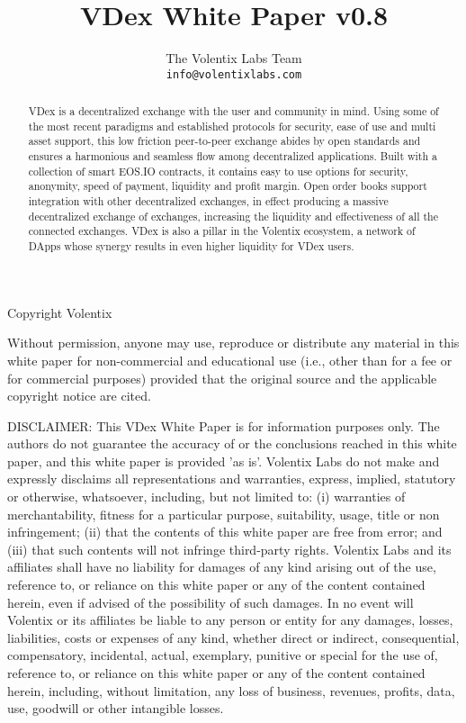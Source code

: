\documentclass[]{article}
\title{VDex White Paper v0.8}
\author{
		The Volentix Labs Team\\
	\texttt{info@volentixlabs.com}
}
\begin{document}
\tableofcontents
\maketitle
\begin{description}
\item Copyright  Volentix
\end{description}

{\tiny Without permission, anyone may use, reproduce or distribute any material in this white paper for non-commercial and educational use (i.e., other than for a fee or for commercial purposes) provided that the original source and the applicable copyright notice are cited.

DISCLAIMER: This VDex White Paper  is for information purposes only. The authors do not guarantee the accuracy of or the conclusions reached in this white paper, and this white paper is provided 'as is'. 
Volentix Labs do not make and expressly disclaims all representations and warranties, express, implied, statutory or otherwise, whatsoever, including, but not limited to: 
(i) warranties of merchantability, fitness for a particular purpose, suitability, usage, title or non infringement; (ii) that the contents of this white paper are free from error; and (iii) that such contents will not infringe third-party rights. Volentix Labs and its affiliates shall have no liability for damages of any kind arising out of the use, reference to, or reliance on this white paper or any of the content contained herein, even if advised of the possibility of such damages. In no event will Volentix or its affiliates be liable to any person or entity for any damages, losses, liabilities, costs or expenses of any kind, whether direct or indirect, consequential, compensatory, incidental, actual, exemplary, punitive or special for the use of, reference to, or reliance on this white paper or any of the content contained herein, including, without limitation, any loss of business, revenues, profits, data, use, goodwill or other intangible losses.}

\begin{abstract}

VDex is a decentralized exchange with the user and community in mind. 
Using some of the most recent paradigms and established protocols for security, 
ease of use and multi asset support, this low friction peer-to-peer exchange 
abides by open standards and ensures a harmonious and seamless flow among 
decentralized applications. Built with a collection of smart EOS.IO contracts, 
it contains easy to use options for security, anonymity, speed of payment, liquidity and profit margin.
Open order books support integration with other decentralized exchanges, 
in effect producing a massive decentralized exchange of exchanges,
 increasing the liquidity and effectiveness of all the connected exchanges.
VDex is also a pillar in the Volentix ecosystem, a network of DApps whose synergy results in even
higher liquidity for VDex users.
\end{abstract}
\end{document}
